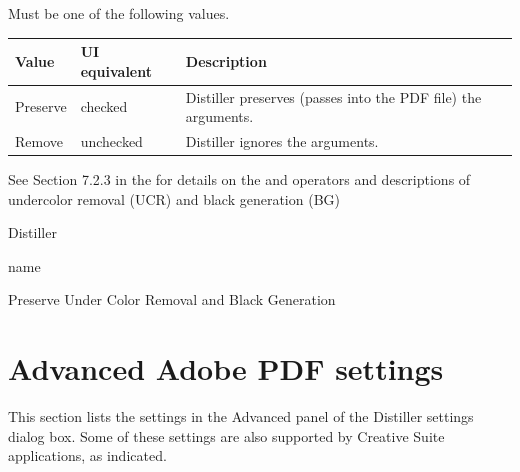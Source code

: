 \documentclass[letterpaper,12pt,english,openany,oneside]{sphinxmanual}
\begin{document}
Must be one of the following values.


\begin{savenotes}\sphinxattablestart
\centering
{}\label{\detokenize{PDF_Create_CommonSettings:section-18}}\nobreak
\begin{tabulary}{\linewidth}[t]{|T|T|T|}
\hline
\sphinxstyletheadfamily 
Value
&\sphinxstyletheadfamily 
UI equivalent
&\sphinxstyletheadfamily 
Description
\\
\hline
Preserve
&
checked
&
Distiller preserves (passes into the PDF file) the arguments.
\\
\hline
Remove
&
unchecked
&
Distiller ignores the arguments.
\\
\hline
\end{tabulary}
\par
\sphinxattableend\end{savenotes}

See Section 7.2.3 in the  for details on the  and  operators and descriptions of undercolor removal (UCR) and black generation (BG)

\label{\detokenize{PDF_Create_CommonSettings:supported-by-85}}

Distiller

\label{\detokenize{PDF_Create_CommonSettings:type-84}}

name

\label{\detokenize{PDF_Create_CommonSettings:ui-name-70}}

Preserve Under Color Removal and Black Generation

\label{\detokenize{PDF_Create_CommonSettings:default-value-79}}

\begin{sphinxVerbatim}[commandchars=\\\{\}]
\end{sphinxVerbatim}




\section{Advanced Adobe PDF settings}
\label{\detokenize{PDF_Create_CommonSettings:advanced-adobe-pdf-settings}}
This section lists the settings in the Advanced panel of the Distiller settings dialog box. Some of these settings are also supported by Creative Suite applications, as indicated.
\end{document}
